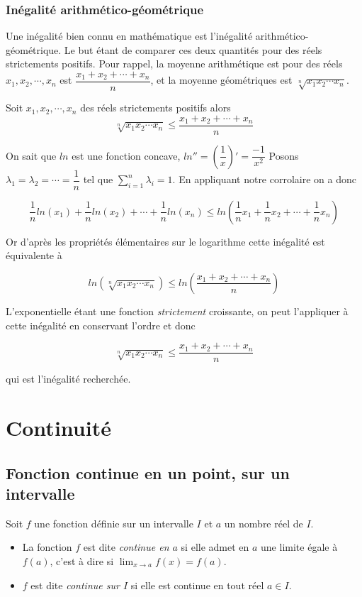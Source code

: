 \documentclass[french]{book}
\newcommand{\ie}{\leq}
\begin{document}
\subsection{Inégalité arithmético-géométrique }

Une inégalité bien connu en mathématique est l'inégalité arithmético-géométrique. Le but étant de comparer ces deux quantités pour des réels strictements positifs. Pour rappel, la moyenne arithmétique est pour des réels $x_1,x_2, \cdots , x_n$ est $\dfrac{x_1+x_2+\cdots+x_n}{n}$, et la moyenne géométriques est $\sqrt[n]{x_1x_2\cdots x_n}$.

\begin{thm}
Soit  $x_1,x_2, \cdots , x_n$ des réels strictements positifs alors 
$$\sqrt[n]{x_1x_2\cdots x_n} \ie \dfrac{x_1+x_2+\cdots+x_n}{n} $$
\end{thm}

\begin{demo}
On sait que $ln$ est une fonction concave, \emph{$ln''=(\dfrac{1}{x})'=\dfrac{-1}{x^2}$}  Posons $\lambda_1=\lambda_2=\cdots=\dfrac{1}{n}$ tel que $\sum_{i=1}^{n} \lambda_i =1$. En appliquant notre corrolaire on a donc 

$$\dfrac{1}{n} ln(x_1) + \dfrac{1}{n} ln(x_2) + \cdots +\dfrac{1}{n} ln(x_n) \ie ln( \dfrac{1}{n}x_1 +\dfrac{1}{n}x_2 + \cdots + \dfrac{1}{n}x_n )$$

Or d'après les propriétés élémentaires sur le logarithme cette inégalité est équivalente à

$$ln(\sqrt[n]{x_1x_2\cdots x_n}) \ie ln( \dfrac{x_1+x_2+\cdots+x_n}{n} )$$

L'exponentielle étant une fonction \emph{strictement} croissante, on peut l'appliquer à cette inégalité en conservant l'ordre et donc 

$$\sqrt[n]{x_1x_2\cdots x_n} \ie \dfrac{x_1+x_2+\cdots+x_n}{n} $$

qui est l'inégalité recherchée.
\end{demo}



\chapter{Continuité}
\section{Fonction continue en un point, sur un intervalle}

\begin{defn}
 Soit $f$ une fonction définie sur un intervalle  $I$ et $a$ un nombre réel de $I$.
\begin{itemize}
 \item[$\bullet$] La fonction $f$ est dite \emph{continue en $a$} si elle admet en $a$ une limite égale à $f(a)$, c'est  à dire si $\lim_{x\rightarrow a}f(x)=f(a)$.
\item[$\bullet$] $f$ est dite \emph{continue sur $I$} si elle est continue en tout réel $a\in I$.
\end{itemize}
\end{defn}
\end{document}
